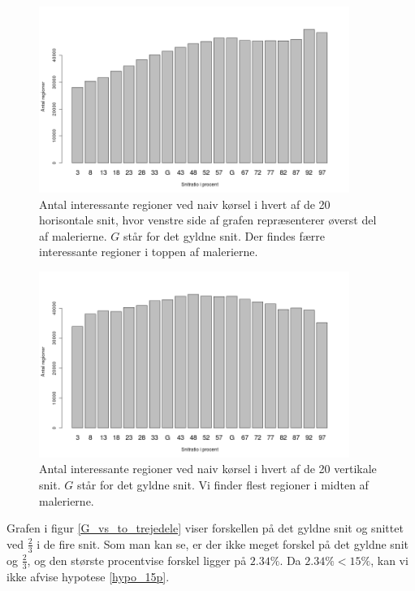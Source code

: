 {\begin{figure}[h!]
	\centering
	\includegraphics[width=0.9\textwidth]{afsnit/resultater/billeder/cut2cut3eatsperratio.png}
    \caption{Antal interessante regioner ved naiv kørsel i hvert af de
    20 horisontale snit, hvor venstre side af grafen repræsenterer
    øverst del af malerierne. $G$ står for det gyldne snit. Der findes
    færre interessante regioner i toppen af malerierne.}
	\label{antal_regioner_horisontale_cut}
\end{figure}

\begin{figure}[h!]
	\centering
	\includegraphics[width=0.9\textwidth]{afsnit/resultater/billeder/cut0cut1eatsperratio.png}
    \caption{Antal interessante regioner ved naiv kørsel i hvert af de
    20 vertikale snit. $G$ står for det gyldne snit. Vi finder flest
    regioner i midten af malerierne.}
	\label{antal_regioner_vertikale_cut}
\end{figure}

Grafen i figur \ref{G_vs_to_trejedele} viser forskellen på det gyldne
snit og snittet ved $\frac{2}{3}$ i de fire snit. Som man kan se, er der
ikke meget forskel på det gyldne snit og $\frac{2}{3}$, og den største
procentvise forskel ligger på $2.34\%$. Da $2.34 \% < 15\%$, kan vi ikke
afvise hypotese \ref{hypo_15p}.

}
